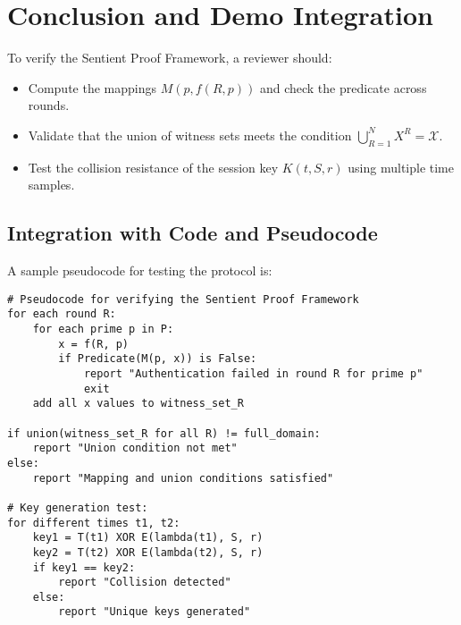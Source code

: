 \documentclass[10pt,twocolumn]{article}
\begin{document}
\section{Conclusion and Demo Integration}
To verify the Sentient Proof Framework, a reviewer should:
\begin{itemize}[leftmargin=0.5cm]
    \item Compute the mappings \(M(p,f(R,p))\) and check the predicate across rounds.
    \item Validate that the union of witness sets meets the condition \(\bigcup_{R=1}^{N} X^R = \mathcal{X}\).
    \item Test the collision resistance of the session key \(K(t,S,r)\) using multiple time samples.
\end{itemize}

\subsection{Integration with Code and Pseudocode}
A sample pseudocode for testing the protocol is:
\begin{lstlisting}
# Pseudocode for verifying the Sentient Proof Framework
for each round R:
    for each prime p in P:
        x = f(R, p)
        if Predicate(M(p, x)) is False:
            report "Authentication failed in round R for prime p"
            exit
    add all x values to witness_set_R

if union(witness_set_R for all R) != full_domain:
    report "Union condition not met"
else:
    report "Mapping and union conditions satisfied"

# Key generation test:
for different times t1, t2:
    key1 = T(t1) XOR E(lambda(t1), S, r)
    key2 = T(t2) XOR E(lambda(t2), S, r)
    if key1 == key2:
        report "Collision detected"
    else:
        report "Unique keys generated"
\end{lstlisting}
\end{document}
